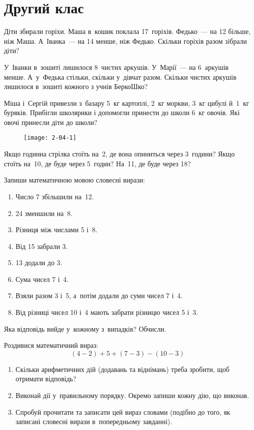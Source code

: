 \chapter{Другий клас}

\problem
Діти збирали горіхи. Маша в~кошик поклала 17~горіхів.
Федько~--- на 12 більше, ніж Маша. А~Іванка~--- на 14 менше, ніж Федько.
Скільки горіхів разом зібрали діти?


\problem
У~Іванки в~зошиті лишилося 8~чистих аркушів.
У~Марії~--- на 6~аркушів менше.
А~у~Федька стільки, скільки у~дівчат разом.
Скільки чистих аркушів лишилося в~зошиті кожного з учнів БеркоШко?


\problem
Міша і~Сергій привезли з~базару 5~кг картоплі, 2~кг моркви,
3~кг цибулі й~1~кг буряків.
Прибігли школярики і допомогли принести до школи 6~кг овочів.
Які овочі принесли діти до школи?


\problem
{}

\begin{figure}[h]
    \centering
    \texttt{[image: 2-04-1]}
\end{figure}

Якщо годинна стрілка стоїть на~2, де вона опиниться через 3~години?
Якщо стоїть на~10, де буде через 5~годин?
На~11, де буде через 18?


\problem
Запиши математичною мовою словесні вирази:
\begin{enumerate}
    \item Число 7 збільшили на~12.
    \item 24 зменшили на~8.
    \item Різниця між числами 5 і~8.
    \item Від 15 забрали 3.
    \item 13 додали до 3.
    \item Сума чисел 7 і~4.
    \item Взяли разом 3 і~5, а~потім додали до суми чисел 7 і~4.
    \item Від різниці чисел 10 і~4 мають забрати різницю чисел 5 і~3.
\end{enumerate}
Яка відповідь вийде у~кожному з~випадків? Обчисли.


\problem
Роздивися математичний вираз:
\[
(4 - 2) + 5 + (7 - 3) - (10 - 3)
\]
\begin{enumerate}
    \item Скільки арифметичних дій (додавань та віднімань)
    треба зробити, щоб отримати відповідь?
    \item Виконай дії у~правильному порядку.
    Окремо запиши кожну дію, що виконав.
    \item Спробуй прочитати та записати цей вираз словами
    (подібно до того, як записані словесні вирази в~попередньому завданні).
\end{enumerate}


